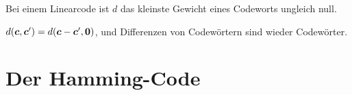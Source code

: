 \begin{merksatz}
Bei einem Linearcode ist $d$ das kleinste Gewicht eines Codeworts ungleich null.

 $d(\boldsymbol{c},\boldsymbol{c}') = d(\boldsymbol{c}-\boldsymbol{c}',\boldsymbol{0})$, und Differenzen von Codewörtern sind wieder Codewörter.

\begin{center}
\begin{minipage}{0.88\textwidth}
\end{minipage}
\end{center}
\end{merksatz}

\section{Der Hamming-Code}

